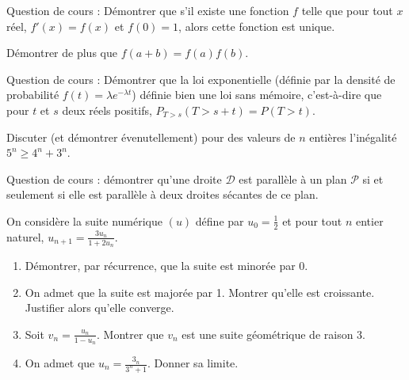 \begin{question}[topic=exponentielle]
Question de cours : Démontrer que s'il existe une fonction $f$ telle que
pour tout $x$ réel, $f'(x) = f(x)$ et $f(0) = 1$, alors cette fonction
est unique.

Démontrer de plus que $f(a+b) = f(a)f(b)$.
\end{question}

\begin{question}[topic=loi_exponentielle]
Question de cours : Démontrer que la loi exponentielle (définie par la
densité de probabilité $f(t) = \lambda e^{-\lambda t}$) définie bien une
loi sans mémoire, c'est-à-dire que pour $t$ et $s$ deux réels positifs,
$P_{T>s}(T > s+t) = P(T > t)$.
\end{question}

\begin{question}[topic=recurrence]
Discuter (et démontrer évenutellement) pour des valeurs de $n$ entières
l'inégalité $5^n \geqslant 4^n + 3^n$.
\end{question}

\begin{question}[topic=géométrie]
Question de cours : démontrer qu'une droite $\mathcal{D}$ est
parallèle à un plan $\mathcal{P}$ si et seulement si elle est parallèle
à deux droites sécantes de ce plan.
\end{question}

\begin{question}[topic=suite]
On considère la suite numérique $(u)$ défine par $u_0 = \frac12$ et pour
tout $n$ entier naturel, $u_{n+1} = \frac{3u_n}{1 + 2u_n}$.

\begin{enumerate}
  \item Démontrer, par récurrence, que la suite est minorée par 0.
  \item On admet que la suite est majorée par 1. Montrer qu'elle est
    croissante. Justifier alors qu'elle converge.
  \item Soit $v_n = \frac{u_n}{1 - u_n}$. Montrer que $v_n$ est une
    suite géométrique de raison 3.
  \item On admet que $u_n = \frac{3_n}{3^n + 1}$. Donner sa limite.
\end{enumerate}
\end{question}

